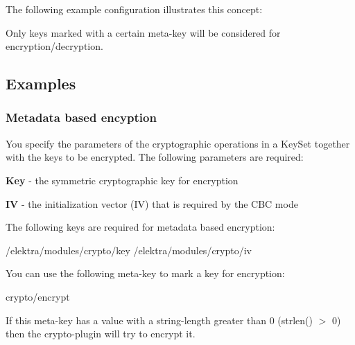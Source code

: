 The following example configuration illustrates this concept\+: 


Only keys marked with a certain meta-\/key will be considered for encryption/decryption.

\subsection*{Examples}

\subsubsection*{Metadata based encyption}

You specify the parameters of the cryptographic operations in a Key\+Set together with the keys to be encrypted. The following parameters are required\+:


\begin{DoxyItemize}
\item {\bfseries Key} -\/ the symmetric cryptographic key for encryption
\item {\bfseries I\+V} -\/ the initialization vector (I\+V) that is required by the C\+B\+C mode
\end{DoxyItemize}

The following keys are required for metadata based encryption\+: \begin{DoxyVerb}    /elektra/modules/crypto/key
    /elektra/modules/crypto/iv
\end{DoxyVerb}


You can use the following meta-\/key to mark a key for encryption\+: \begin{DoxyVerb}    crypto/encrypt
\end{DoxyVerb}


If this meta-\/key has a value with a string-\/length greater than 0 ({\ttfamily strlen() $>$ 0}) then the crypto-\/plugin will try to encrypt it. 